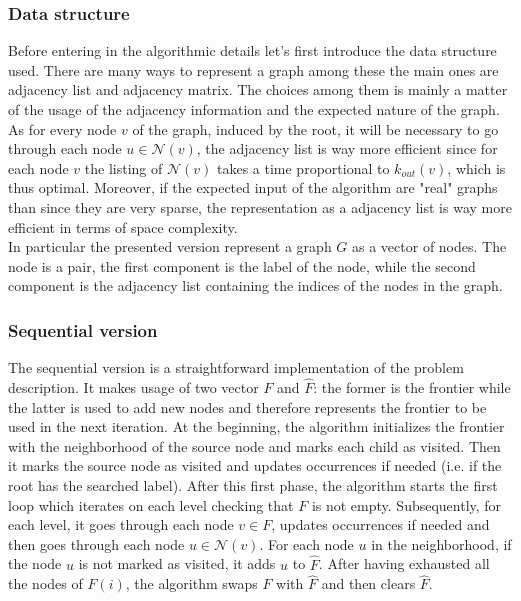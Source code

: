 \subsubsection{Data structure}
Before entering in the algorithmic details let's first introduce the data structure used.
There are many ways to represent a graph among these the main ones are adjacency list and adjacency
matrix. The choices among them is mainly a matter of the usage of the adjacency information and the 
expected nature of the graph. As for every node $v$ of the graph, induced by the root, it will be necessary
to go through each node $u \in \mathcal{N}(v)$, the adjacency list is way more efficient since for each
node $v$ the listing of $\mathcal{N}(v)$ takes a time proportional to $k_{out}(v)$, which is thus optimal.
Moreover, if the expected input of the algorithm are "real" graphs than since they are very sparse, the representation as a adjacency list is way 
more efficient in terms of space complexity.
\\
In particular the presented version represent a graph $G$ as a vector of nodes.
 The node is a pair, the first component is the label of the node, while the second
 component is the adjacency list containing the indices of the nodes in the graph.
\subsubsection{Sequential version}
The sequential version is a straightforward implementation of the problem
description. It makes usage of two vector $F$ and $\hat{F}$: the former is the frontier 
while the latter is used to add new nodes and therefore represents the frontier 
to be used in the next iteration. At the beginning, the algorithm initializes the frontier
with the neighborhood of the source node and marks each child as visited. Then it marks the source node 
as visited and updates occurrences if needed (i.e. if the root has the searched label). After this first phase,
 the algorithm starts the first loop which iterates on each level checking that $F$ is not empty.
 Subsequently, for each level, it goes through each node $v \in F$, updates occurrences if needed and
 then goes through each node $u \in \mathcal{N}(v)$.
 For each node $u$ in the neighborhood, if the node $u$ is not marked as visited, 
 it adds $u$ to $\hat{F}$. After having exhausted all the nodes of $F(i)$, the algorithm
 swaps $F$ with $\hat{F}$ and then clears $\hat{F}$.

